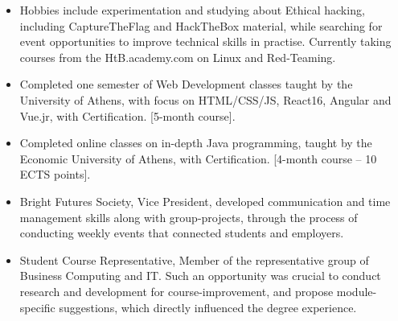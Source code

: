 
\begin{itemize}
    \item Hobbies include experimentation and studying about Ethical hacking, including CaptureTheFlag and HackTheBox material, while searching for event opportunities to improve technical skills in practise. Currently taking courses from the HtB.academy.com on Linux and Red-Teaming.
    \item Completed one semester of Web Development classes taught by the University of Athens, with focus on HTML/CSS/JS, React16, Angular and Vue.jr, with Certification. [5-month course].
    \item Completed online classes on in-depth Java programming, taught by the Economic University of Athens, with Certification. [4-month course – 10 ECTS points].
    \item Bright Futures Society, Vice President, developed communication and time management skills along with group-projects, through the process of conducting weekly events that connected students and employers.
    \item Student Course Representative, Member of the representative group of Business Computing and IT. Such an opportunity was crucial to conduct research and development for course-improvement, and propose module-specific suggestions, which directly influenced the degree experience.

\end{itemize}


